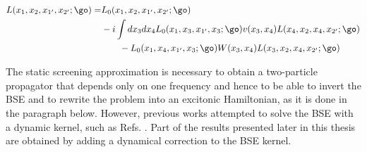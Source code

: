 \begin{align}
\begin{split}
	L(x_1,x_2,x_{1'},x_{2'};\go) = &L_0(x_1,x_2,x_{1'},x_{2'};\go) \\
	    &-i \int dx_3dx_4 L_0(x_1,x_3,x_{1'},x_{3};\go) v(x_3,x_4) L(x_4,x_2,x_{4},x_{2'};\go) \\
		&\qquad - L_0(x_1,x_4,x_{1'},x_{3};\go) W(x_3,x_4)  L(x_3,x_2,x_{4},x_{2'};\go) \label{eq:GW-BSE}
\end{split}
\end{align}

The static screening approximation is necessary to obtain a two-particle propagator that depends only on one frequency and hence to be able to invert the \gls{BSE} and to rewrite the problem into an excitonic Hamiltonian, as it is done in the paragraph below. However, previous works attempted to solve the \gls{BSE} with a dynamic kernel, such as Refs. \cite{shindo1970effective,adamska2021bethe}. Part of the results presented later in this thesis are obtained by adding a dynamical correction to the \gls{BSE} kernel.

